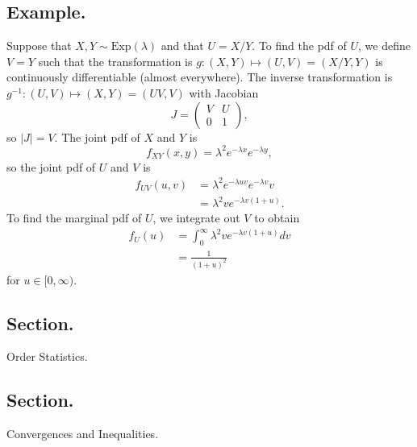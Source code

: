 \documentclass[titlepage]{article}
\begin{document}
\subsection{Example.} Suppose that $X, Y \sim \text{Exp}(\lambda)$ and that $U = X/Y$. To find the pdf of $U$, we define $V = Y$ such that the transformation is $g: (X, Y) \mapsto (U, V) = (X/Y, Y)$ is continuously differentiable (almost everywhere). The inverse transformation is $g^{-1}: (U, V) \mapsto (X, Y) = (UV, V)$ with Jacobian 
$$J = \begin{pmatrix}
    V & U \\
    0 & 1
\end{pmatrix},$$
so $|J| = V$. The joint pdf of $X$ and $Y$ is 
$$f_{XY}(x, y) = \lambda^{2}e^{-\lambda x}e^{-\lambda y},$$
so the joint pdf of $U$ and $V$ is
\begin{align*}
    f_{UV}(u, v) &= \lambda^{2}e^{-\lambda uv}e^{-\lambda v}v \\
                 &= \lambda^{2}ve^{-\lambda v(1 + u)}.
\end{align*}
To find the marginal pdf of $U$, we integrate out $V$ to obtain 
\begin{align*}
    f_{U}(u) &= \int_{0}^{\infty}\lambda^{2}ve^{-\lambda v(1 + u)}dv \\
             &= \frac{1}{(1 + u)^{2}}
\end{align*}
for $u \in [0, \infty)$.

\newpage {}

\subsection{Section.} Order Statistics.

\newpage {}

\subsection{Section.} Convergences and Inequalities.
\end{document}
